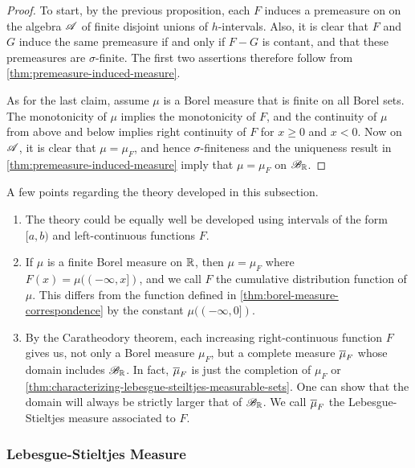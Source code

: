 \documentclass[12pt]{article} %
\begin{document}
\begin{proof}
    To start, by the previous proposition, each $F$ induces a premeasure on on the algebra $\mathscr{A}$ of finite disjoint unions of $h$-intervals. Also, it is clear that $F$ and $G$ induce the same premeasure if and only if $F - G$ is contant, and that these premeasures are $\sigma$-finite. The first two assertions therefore follow from \cref{thm:premeasure-induced-measure}. 

    As for the last claim, assume $\mu$ is a Borel measure that is finite on all Borel sets. The monotonicity of $\mu$ implies the monotonicity of $F$, and the continuity of $\mu$ from above and below implies right continuity of $F$ for $x \geq 0$ and $x < 0$. Now on $\mathscr{A}$, it is clear that $\mu = \mu_F$, and hence $\sigma$-finiteness and the uniqueness result in \cref{thm:premeasure-induced-measure} imply that $\mu = \mu_F$ on $\mathscr{B}_{\mathbb{R}}$.
\end{proof}

\begin{remark}
    A few points regarding the theory developed in this subsection.
    \begin{enumerate}
        \item The theory could be equally well be developed using intervals of the form $[a, b)$ and left-continuous functions $F$.
        \item If $\mu$ is a finite Borel measure on $\mathbb{R}$, then $\mu = \mu_F$ where $F(x) = \mu((-\infty, x])$, and we call $F$ the cumulative distribution function of $\mu$. This differs from the function defined in \cref{thm:borel-measure-correspondence} by the constant $\mu((-\infty, 0])$.
        \item By the Caratheodory theorem, each increasing right-continuous function $F$ gives us, not only a Borel measure $\mu_F$, but a complete measure $\overline{\mu}_F$ whose domain includes $\mathscr{B}_{\mathbb{R}}$. In fact, $\overline{\mu}_F$ is just the completion of $\mu_F$ \citep[Exercise~22a]{folland1999real} or \cref{thm:characterizing-lebesgue-steiltjes-measurable-sets}. One can show that the domain will always be strictly larger that of $\mathscr{B}_{\mathbb{R}}$. We call $\overline{\mu}_F$ the Lebesgue-Stieltjes measure associated to $F$. 
    \end{enumerate}
\end{remark}

\subsubsection{Lebesgue-Stieltjes Measure}
\end{document}
